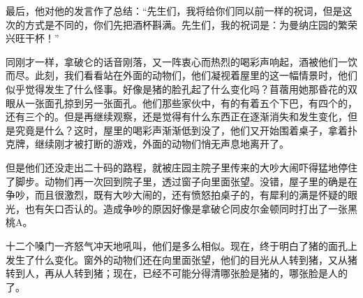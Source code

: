 最后，他对他的发言作了总结：“先生们，我将给你们同以前一样的祝词，但是这次的方式是不同的，你们先把酒杯斟满。先生们，我的祝词是：为曼纳庄园的繁荣兴旺干杯！”

同刚才一样，拿破仑的话音刚落，又一阵衷心而热烈的喝彩声响起，酒被他们一饮而尽。此刻，我们看看站在外面的动物们，他们凝视着屋里的这一幅情景时，他们似乎觉得发生了什么怪事。好像是猪的脸孔起了什么变化吗？苜蓿用她那昏花的双眼从一张面孔掠到另一张面孔。他们那些家伙中，有的有着五个下巴，有四个的，还有三个的。但是再继续观察，还是觉得有什么东西正在逐渐消失和发生变化，但是究竟是什么？这时，屋里的喝彩声渐渐低到没了，他们又开始围着桌子，拿着扑克牌，继续刚才被打断的游戏，外面的动物们悄无声息地离开了。

但是他们还没走出二十码的路程，就被庄园主院子里传来的大吵大闹吓得猛地停住了脚步。动物们再一次回到院子里，透过窗子向里面张望。没错，屋子里的确是在争吵，而且很激烈，既有大吵大闹的，还有愤怒拍桌子的，有犀利的满是怀疑的眼光，也有矢口否认的。造成争吵的原因好像是拿破仑同皮尔金顿同时打出了一张黑桃A。

十二个嗓门一齐怒气冲天地吼叫，他们是多么相似。现在，终于明白了猪的面孔上发生了什么变化。窗外的动物们还在向里面张望，他们的目光从人转到猪，又从猪转到人，再从人转到猪；现在，已经不可能分得清哪张脸是猪的，哪张脸是人的了。
